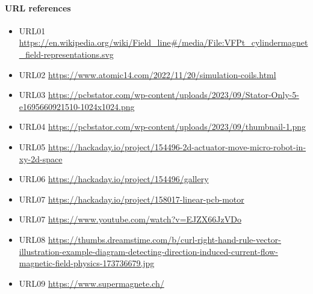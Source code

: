 \renewcommand{\listfigurename}{List of Figures}
\listoffigures
\addcontentsline{toc}{chapter}{\listfigurename} %

\paragraph{URL references}

\begin{itemize}

	\item URL01 \href{https://en.wikipedia.org/wiki/Field\_line\#/media/File:VFPt\_cylindermagnet\_field-representations.svg}{https://en.wikipedia.org/wiki/Field\_line\#/media/File:VFPt\_cylindermagnet\_field-representations.svg}

	\item URL02 \href{https://www.atomic14.com/2022/11/20/simulation-coils.html}{https://www.atomic14.com/2022/11/20/simulation-coils.html}

	\item URL03 \href{https://pcbstator.com/wp-content/uploads/2023/09/Stator-Only-5-e1695660921510-1024x1024.png}{https://pcbstator.com/wp-content/uploads/2023/09/Stator-Only-5-e1695660921510-1024x1024.png}

	\item URL04 \href{https://pcbstator.com/wp-content/uploads/2023/09/thumbnail-1.png}{https://pcbstator.com/wp-content/uploads/2023/09/thumbnail-1.png}

	\item URL05 \href{https://hackaday.io/project/154496-2d-actuator-move-micro-robot-in-xy-2d-space}{https://hackaday.io/project/154496-2d-actuator-move-micro-robot-in-xy-2d-space}

	\item URL06 \href{https://hackaday.io/project/154496/gallery}{https://hackaday.io/project/154496/gallery}

	\item URL07 \href{https://hackaday.io/project/158017-linear-pcb-motor}{https://hackaday.io/project/158017-linear-pcb-motor}

	\item URL07 \href{https://www.youtube.com/watch?v=EJZX66JzVDo}{https://www.youtube.com/watch?v=EJZX66JzVDo}

	\item URL08 \href{https://thumbs.dreamstime.com/b/curl-right-hand-rule-vector-illustration-example-diagram-detecting-direction-induced-current-flow-magnetic-field-physics-173736679.jpg}{https://thumbs.dreamstime.com/b/curl-right-hand-rule-vector-illustration-example-diagram-detecting-direction-induced-current-flow-magnetic-field-physics-173736679.jpg}

	\item URL09 \href{https://www.supermagnete.ch/}{https://www.supermagnete.ch/}

\end{itemize}

